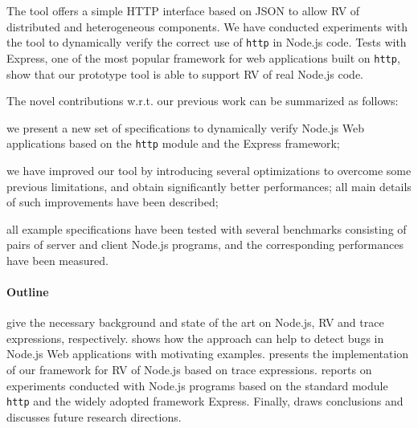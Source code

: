 The tool offers a simple HTTP interface based on JSON to allow RV of
distributed and heterogeneous components.
%
We have conducted experiments with the tool to  dynamically verify
the correct use of \lstinline{http} in Node.js code.
Tests with Express, one of the most popular framework for web applications built on \lstinline{http}, show
that our prototype tool is able to support RV of real Node.js code.

The novel contributions w.r.t. our previous work \cite{TowardsIoT17} can be summarized as follows:
\begin{enumerate*}[label=(\alph*)]
\item we present a new set of specifications to dynamically verify Node.js Web applications based on the \lstinline{http} module and
  the Express framework;
\item we have improved our tool by introducing several optimizations to overcome some previous limitations, and obtain significantly better performances; all main details of such improvements have been described;
\item all example specifications have been tested with several benchmarks consisting of pairs of server and client Node.js programs, and the corresponding performances have been measured.
\end{enumerate*}

\paragraph{Outline}
 give the necessary background and state of the art on Node.js, RV and trace expressions, respectively.
 shows how the approach can help to detect bugs in Node.js Web applications with motivating examples.
 presents the implementation of our framework for RV of Node.js based on trace expressions.
 reports on experiments conducted with Node.js programs based on the standard module
\lstinline{http} and the widely adopted framework Express.
Finally,  draws conclusions and discusses future research directions.
